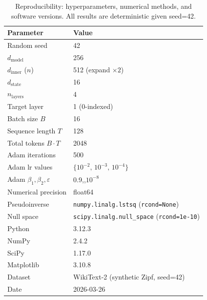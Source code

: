 \begin{table}[h]
\centering
\caption{Reproducibility: hyperparameters, numerical methods, and software versions.
  All results are deterministic given seed=42.}
\label{tab:repro}
\begin{tabular}{ll}
\toprule
\textbf{Parameter} & \textbf{Value} \\
\midrule
Random seed & 42 \\
$d_{\text{model}}$ & 256 \\
$d_{\text{inner}}$ ($n$) & 512  (expand $\times 2$) \\
$d_{\text{state}}$ & 16 \\
$n_{\text{layers}}$ & 4 \\
Target layer & 1 (0-indexed) \\
Batch size $B$ & 16 \\
Sequence length $T$ & 128 \\
Total tokens $B \cdot T$ & 2048 \\
Adam iterations & 500 \\
Adam lr values & $\{10^{-2},\,10^{-3},\,10^{-4}\}$ \\
Adam $\beta_1, \beta_2, \varepsilon$ & 0.9,\;0.999,\;$10^{-8}$ \\
Numerical precision & float64 \\
Pseudoinverse & \texttt{numpy.linalg.lstsq} (\texttt{rcond=None}) \\
Null space & \texttt{scipy.linalg.null\_space} (\texttt{rcond=1e-10}) \\
\midrule
Python & 3.12.3 \\
NumPy & 2.4.2 \\
SciPy & 1.17.0 \\
Matplotlib & 3.10.8 \\
Dataset & WikiText-2 (synthetic Zipf, seed=42) \\
Date & 2026-03-26 \\
\bottomrule
\end{tabular}
\end{table}
